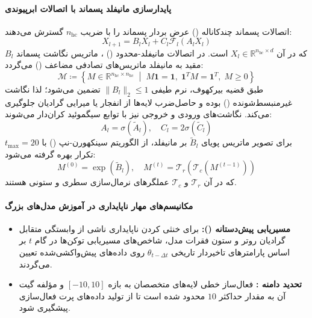 \paragraph*{پایدارسازی مانیفلد پسماند با اتصالات ابرپیوندی }
اتصالات پسماند چندکاناله () عرض بردار پسماند را با ضریب $n_{\text{hc}}$ گسترش می‌دهند:
\begin{equation}
    X_{l+1} = B_l X_l + C_l \mathcal{F}_l(A_l X_l)
\end{equation}
که در آن $X_l \in \mathbb{R}^{n_{\text{hc}} \times d}$ است. در اتصالات مانیفلد-محدود () \cite{xie2026mhc}، ماتریس نگاشت پسماند $B_l$ مقید به مانیفلد ماتریس‌های تصادفی مضاعف () می‌گردد:
\begin{equation}
    \mathcal{M} \coloneqq \left\{ M \in \mathbb{R}^{n_{\text{hc}} \times n_{\text{hc}}} \;\middle|\; M \mathbf{1} = \mathbf{1}, \; \mathbf{1}^T M = \mathbf{1}^T, \; M \ge 0 \right\}
\end{equation}
طبق قضیه بیرکهوف، نرم طیفی $\|B_l\|_2 \le 1$ تضمین می‌شود؛ لذا نگاشت غیرمنبسط‌شونده () بوده و حاصل‌ضرب لایه‌ها از انفجار یا میرایی گرادیان جلوگیری می‌کند. نگاشت‌های ورودی و خروجی نیز با توابع سیگموئید کران‌دار می‌شوند:
\begin{equation}
    A_l = \sigma(\tilde{A}_l), \quad C_l = 2\sigma(\tilde{C}_l)
\end{equation}
برای تصویر ماتریس پویای $\tilde{B}_l$ بر مانیفلد، از الگوریتم سینکهورن-نپ () با $t_{\max}=20$ تکرار بهره گرفته می‌شود:
\begin{equation}
    M^{(0)} = \exp(\tilde{B}_l), \quad M^{(t)} = \mathcal{T}_r(\mathcal{T}_c(M^{(t-1)}))
\end{equation}
که در آن $\mathcal{T}_r$ و $\mathcal{T}_c$ عملگرهای نرمال‌سازی سطری و ستونی هستند.

\paragraph*{مکانیسم‌های مهار ناپایداری در آموزش مدل‌های بزرگ}
\begin{itemize}
    \item \textbf{مسیریابی پیش‌دستانه ():} برای خنثی کردن ناپایداری ناشی از وابستگی متقابل گرادیان روتر و ستون فقرات مدل، شاخص‌های مسیریابی توکن‌ها در گام $t$ بر اساس پارامترهای تاخیردار تاریخی $\theta_{t-\Delta t}$ روی داده‌های پیش‌واکشی‌شده تعیین می‌گردند.
    \item \textbf{تحدید دامنه :} فعال‌ساز خطی لایه‌های متخصصان به بازه $[-10, 10]$ و مؤلفه گیت آن به مقدار حداکثر $10$ محدود شده است تا از تولید داده‌های پرت فعال‌سازی پیشگیری شود.
\end{itemize}

